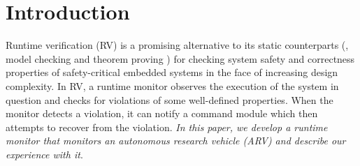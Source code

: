 \section{Introduction}
Runtime verification (RV) is a promising alternative to its static counterparts (\eg, model checking \cite{Clarke1996} and theorem proving \cite{Chang1997}) 
for checking system safety and correctness properties of safety-critical embedded systems in the face of increasing design complexity. 
In RV, a runtime monitor observes the execution of the system in question and checks for violations of some well-defined properties. 
When the monitor detects a violation, it can notify a command module which then attempts to recover from the violation. \emph{In this paper, we develop a runtime monitor that monitors an autonomous research vehicle (ARV) and describe our experience with it}.

